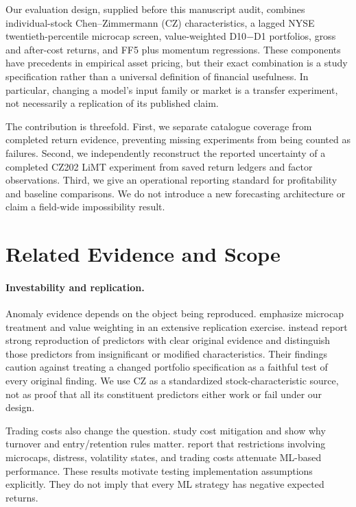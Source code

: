 \documentclass{article}
\begin{document}
Our evaluation design, supplied before this manuscript audit, combines individual-stock Chen--Zimmermann (CZ) characteristics, a lagged NYSE twentieth-percentile microcap screen, value-weighted D10$-$D1 portfolios, gross and after-cost returns, and FF5 plus momentum regressions. These components have precedents in empirical asset pricing, but their exact combination is a study specification rather than a universal definition of financial usefulness. In particular, changing a model's input family or market is a transfer experiment, not necessarily a replication of its published claim.

The contribution is threefold. First, we separate catalogue coverage from completed return evidence, preventing missing experiments from being counted as failures. Second, we independently reconstruct the reported uncertainty of a completed CZ202 LiMT experiment from saved return ledgers and factor observations. Third, we give an operational reporting standard for profitability and baseline comparisons. We do not introduce a new forecasting architecture or claim a field-wide impossibility result.

\section{Related Evidence and Scope}
\paragraph{Investability and replication.}
Anomaly evidence depends on the object being reproduced. \cite{hou2017} emphasize microcap treatment and value weighting in an extensive replication exercise. \cite{chen2022} instead report strong reproduction of predictors with clear original evidence and distinguish those predictors from insignificant or modified characteristics. Their findings caution against treating a changed portfolio specification as a faithful test of every original finding. We use CZ as a standardized stock-characteristic source, not as proof that all its constituent predictors either work or fail under our design.

Trading costs also change the question. \cite{novymarx2016} study cost mitigation and show why turnover and entry/retention rules matter. \cite{avramov2023} report that restrictions involving microcaps, distress, volatility states, and trading costs attenuate ML-based performance. These results motivate testing implementation assumptions explicitly. They do not imply that every ML strategy has negative expected returns.
\end{document}
